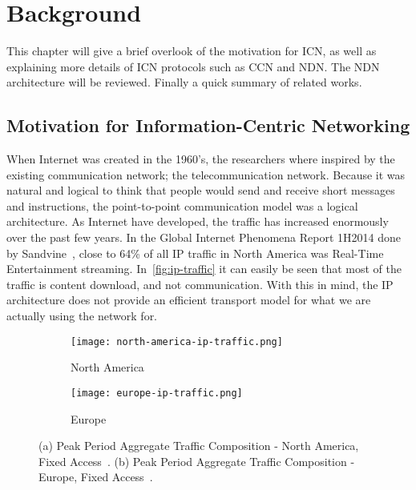 \chapter{Background}\label{chp:background} 

This chapter will give a brief overlook of the motivation for \gls{ICN},
as well as explaining more details of \gls{ICN} protocols such as \gls{CCN} and \gls{NDN}.
The \gls{NDN} architecture will be reviewed.
Finally a quick summary of related works.

\section{Motivation for Information-Centric Networking}
When Internet was created in the 1960's, the researchers where inspired by the existing communication network; the telecommunication network.
Because it was natural and logical to think that people would send and receive short messages and instructions, the point-to-point communication model was a logical architecture. 
As Internet have developed, the traffic has increased enormously over the past few years. 
In the Global Internet Phenomena Report 1H2014 done by Sandvine~\cite{gipr2014}, close to 64\% of all \gls{IP} traffic in North America was Real-Time Entertainment streaming.
In~\autoref{fig:ip-traffic} it can easily be seen that most of the traffic is content download, and not communication.
With this in mind, the \gls{IP} architecture does not provide an efficient transport model for what we are actually using the network for.

\begin{figure}[ht]
  \centering
  \begin{subfigure}{0.48\textwidth}
    \centering
    \texttt{[image: north-america-ip-traffic.png]}
    \caption{North America}
    \label{fig:north-america-ip-traffic}
  \end{subfigure}

  \begin{subfigure}{0.48\textwidth}
    \centering
    \texttt{[image: europe-ip-traffic.png]}
    \caption{Europe}
    \label{fig:europe-ip-traffic}
  \end{subfigure}
  \caption{
  (a) Peak Period Aggregate Traffic Composition - North America, Fixed Access~\cite{gipr2014}.
  (b) Peak Period Aggregate Traffic Composition - Europe, Fixed Access~\cite{gipr2014}.
  }
  \label{fig:ip-traffic}
\end{figure}

